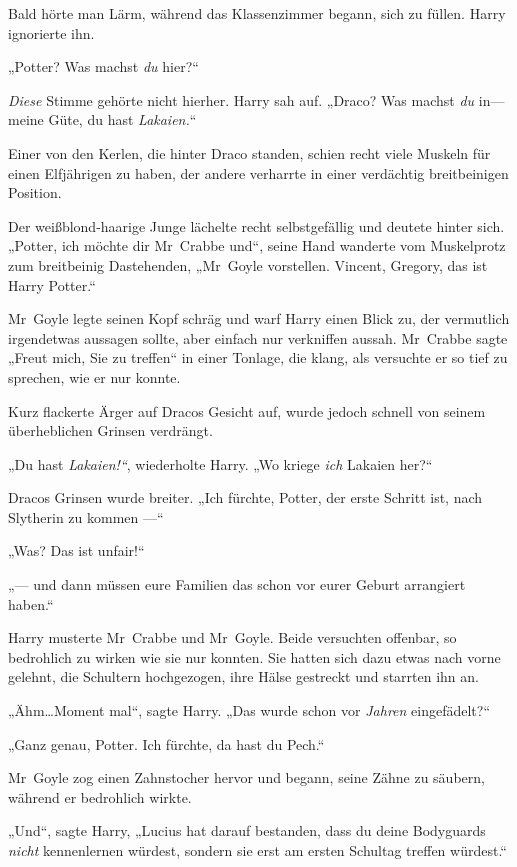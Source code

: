 {Bald hörte man Lärm, während das Klassenzimmer begann, sich zu füllen. Harry ignorierte ihn.

„Potter? Was machst \emph{du} hier?“

\emph{Diese} Stimme gehörte nicht hierher. Harry sah auf. „Draco? Was machst \emph{du} in—meine Güte, du hast \emph{Lakaien.}“

Einer von den Kerlen, die hinter Draco standen, schien recht viele Muskeln für einen Elfjährigen zu haben, der andere verharrte in einer verdächtig breitbeinigen Position.

Der weißblond-haarige Junge lächelte recht selbstgefällig und deutete hinter sich. „Potter, ich möchte dir Mr~Crabbe und“, seine Hand wanderte vom Muskelprotz zum breitbeinig Dastehenden, „Mr~Goyle vorstellen. Vincent, Gregory, das ist Harry Potter.“

Mr~Goyle legte seinen Kopf schräg und warf Harry einen Blick zu, der vermutlich irgendetwas aussagen sollte, aber einfach nur verkniffen aussah. Mr~Crabbe sagte „Freut mich, Sie zu treffen“ in einer Tonlage, die klang, als versuchte er so tief zu sprechen, wie er nur konnte.

Kurz flackerte Ärger auf Dracos Gesicht auf, wurde jedoch schnell von seinem überheblichen Grinsen verdrängt.

„Du hast \emph{Lakaien!“}, wiederholte Harry. „Wo kriege \emph{ich} Lakaien her?“

Dracos Grinsen wurde breiter. „Ich fürchte, Potter, der erste Schritt ist, nach Slytherin zu kommen —“

„Was? Das ist unfair!“

„— und dann müssen eure Familien das schon vor eurer Geburt arrangiert haben.“

Harry musterte Mr~Crabbe und Mr~Goyle. Beide versuchten offenbar, so bedrohlich zu wirken wie sie nur konnten. Sie hatten sich dazu etwas nach vorne gelehnt, die Schultern hochgezogen, ihre Hälse gestreckt und starrten ihn an.

„Ähm…Moment mal“, sagte Harry. „Das wurde schon vor \emph{Jahren} eingefädelt?“

„Ganz genau, Potter. Ich fürchte, da hast du Pech.“

Mr~Goyle zog einen Zahnstocher hervor und begann, seine Zähne zu säubern, während er bedrohlich wirkte.

„Und“, sagte Harry, „Lucius hat darauf bestanden, dass du deine Bodyguards \emph{nicht} kennenlernen würdest, sondern sie erst am ersten Schultag treffen würdest.“

}
